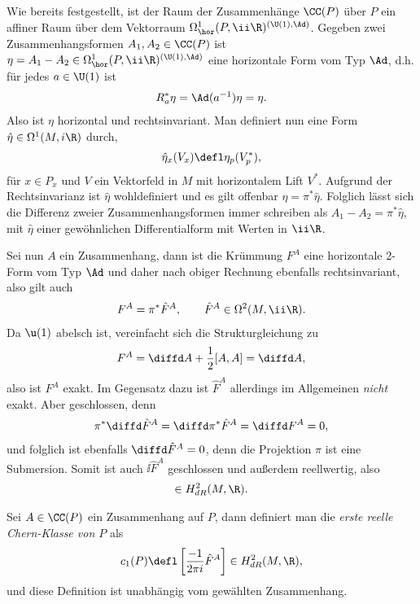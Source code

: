 \documentclass[%
	paper=a5,%
	fleqn,%
	DIV=18,%
	BCOR=0mm,
	fontsize=11pt,
	titlepage=false,%
	bibliography=totoc,
	DIV=18,%
	twoside=true,
	pdftitle=Riemannsche Geometrie,
	pdfauthor=Uwe Semmelmann,
	numbers=noendperiod]%
	{scrbook}
\begin{document}
Wie bereits festgestellt, ist der Raum der Zusammenhänge $\CC(P)$ über $P$ ein
affiner Raum über dem Vektorraum $\Omega^1_\hor(P,\ii\R)^{(\U(1),\Ad)}$. Gegeben
zwei Zusammenhangsformen $A_1,A_2\in\CC(P)$ ist $\eta =
A_1-A_2\in\Omega^1_\hor(P,\ii\R)^{(\U(1),\Ad)}$ eine horizontale Form vom Typ
$\Ad$, d.h. für jedes $a\in\U(1)$ ist
\begin{align*}
R_a^*\eta = \Ad(a^{-1})\eta = \eta.
\end{align*}
Also ist $\eta$ horizontal und rechtsinvariant. Man definiert nun eine Form
$\hat{\eta}\in\Omega^1(M,i\R)$ durch,
\begin{align*}
\hat{\eta}_x(V_x) \defl \eta_p(V^*_p),
\end{align*}
für $x\in P_x$ und $V$ ein Vektorfeld in $M$ mit horizontalem Lift $V^*$.
Aufgrund der Rechtsinvarianz ist $\hat{\eta}$ wohldefiniert und es gilt
offenbar $\eta = \pi^*\hat{\eta}$. Folglich lässt sich die Differenz
zweier Zusammenhangsformen immer schreiben als $A_1-A_2 = \pi^* \hat{\eta}$, mit
$\hat{\eta}$ einer gewöhnlichen Differentialform mit Werten in $\ii\R$.

Sei nun $A$ ein Zusammenhang, dann ist die Krümmung $F^A$ eine horizontale
2-Form vom Typ $\Ad$ und daher nach obiger Rechnung ebenfalls rechtsinvariant,
also gilt auch
\begin{align*}
F^A = \pi^*\hat{F}^A,\qquad \hat{F}^A\in\Omega^2(M,\ii\R).
\end{align*}
Da $\u(1)$ abelsch ist, vereinfacht sich die Strukturgleichung zu
\begin{align*}
F^A = \diffd A + \frac{1}{2}[A,A] = \diffd A,
\end{align*}
also ist $F^A$ exakt. Im Gegensatz dazu ist
$\hat{F}^A$ allerdings im Allgemeinen \textit{nicht} exakt. Aber geschlossen, denn
\begin{align*}
\pi^*\diffd \hat{F}^A = \diffd\pi^* \hat{F}^A = \diffd F^A = 0,
\end{align*}
und folglich ist ebenfalls $\diffd \hat{F}^A = 0$, denn die Projektion
$\pi$ ist eine Submersion. Somit ist auch $\ii\hat{F}^A$ geschlossen und
außerdem reellwertig, also
\begin{align*}
[\ii \hat{F}^A]\in H_{dR}^2(M,\R).
\end{align*}

\begin{defn}
\label{defn:Erste-Chern-Klasse}
Sei $A\in\CC(P)$ ein Zusammenhang auf $P$, dann definiert man die
\emph{erste reelle Chern-Klasse von $P$} als
\begin{align*}
c_1(P)\defl \left[\frac{-1}{2\pi i} \hat{F}^A \right] \in H^2_{dR}(M,\R),
\end{align*}
und diese Definition ist unabhängig vom gewählten Zusammenhang.\fish
\end{defn}
\end{document}
